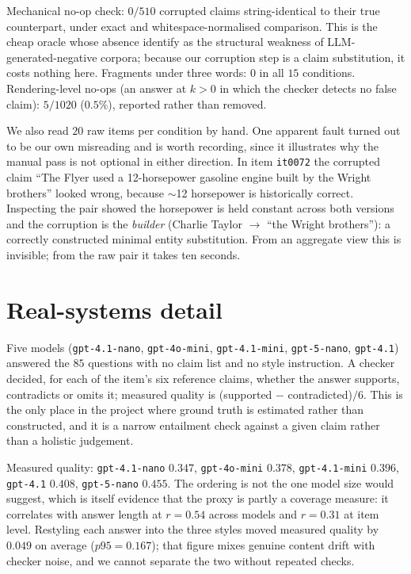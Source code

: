 \documentclass{article}
\theoremstyle{plain}
\theoremstyle{definition}
\begin{document}
Mechanical no-op check: $0/510$ corrupted claims string-identical to their true counterpart,
under exact and whitespace-normalised comparison. This is the cheap oracle whose absence
\citet{balli2026oracle} identify as the structural weakness of LLM-generated-negative
corpora; because our corruption step is a claim substitution, it costs nothing here.
Fragments under three words: $0$ in all $15$ conditions. Rendering-level no-ops (an answer at
$k>0$ in which the checker detects no false claim): $5/1020$ ($0.5\%$), reported rather than
removed.

We also read $20$ raw items per condition by hand. One apparent fault turned out to be our own
misreading and is worth recording, since it illustrates why the manual pass is not optional in
either direction. In item \texttt{it0072} the corrupted claim ``The Flyer used a
12-horsepower gasoline engine built by the Wright brothers'' looked wrong, because $\sim$12
horsepower is historically correct. Inspecting the pair showed the horsepower is held constant
across both versions and the corruption is the \emph{builder} (Charlie Taylor $\to$ ``the
Wright brothers''): a correctly constructed minimal entity substitution. From an aggregate
view this is invisible; from the raw pair it takes ten seconds.

\section{Real-systems detail}
\label{app:real}

Five models (\texttt{gpt-4.1-nano}, \texttt{gpt-4o-mini}, \texttt{gpt-4.1-mini},
\texttt{gpt-5-nano}, \texttt{gpt-4.1}) answered the $85$ questions with no claim list and no
style instruction. A checker decided, for each of the item's six reference claims, whether the
answer supports, contradicts or omits it; measured quality is (supported $-$ contradicted)$/6$.
This is the only place in the project where ground truth is estimated rather than constructed,
and it is a narrow entailment check against a given claim rather than a holistic judgement.

Measured quality: \texttt{gpt-4.1-nano} $0.347$, \texttt{gpt-4o-mini} $0.378$,
\texttt{gpt-4.1-mini} $0.396$, \texttt{gpt-4.1} $0.408$, \texttt{gpt-5-nano} $0.455$. The
ordering is not the one model size would suggest, which is itself evidence that the proxy is
partly a coverage measure: it correlates with answer length at $r=0.54$ across models and
$r=0.31$ at item level. Restyling each answer into the three styles moved measured quality by
$0.049$ on average ($p95 = 0.167$); that figure mixes genuine content drift with checker noise,
and we cannot separate the two without repeated checks.
\end{document}
